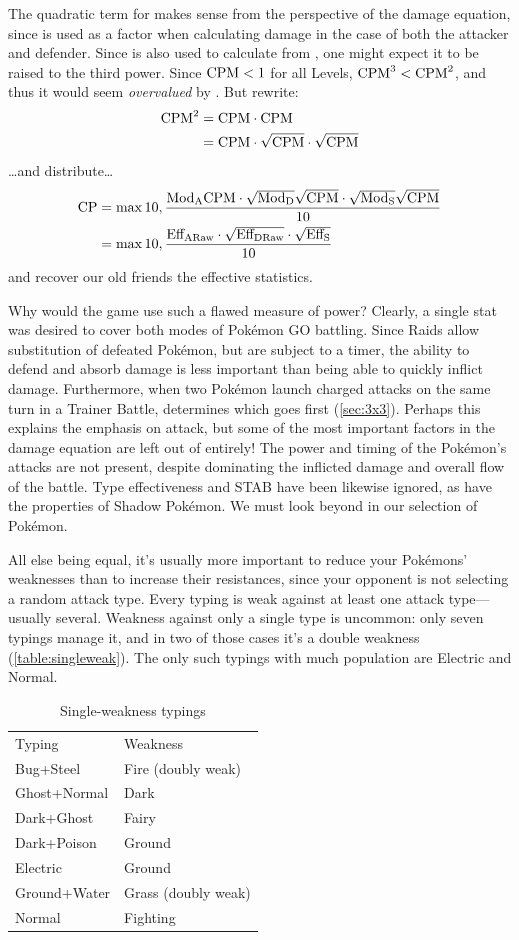 The quadratic term for \CPM{} makes sense from the perspective of the damage
 equation, since \CPM{} is used as a factor when calculating damage in the
 case of both the attacker and defender.
Since \CPM{} is also used to calculate \MHP{} from , one might
 expect it to be raised to the third power.
Since $\mbox{CPM} < 1$ for all Levels, $\mbox{CPM}^3 < \mbox{CPM}^2$, and thus it would seem \textit{overvalued} by \CP\@.
But rewrite:
\begin{align*}
  \mbox{CPM}^2 &= \mbox{CPM} \cdot \mbox{CPM}\\
  &= \mbox{CPM} \cdot \sqrt{\mbox{CPM}} \cdot \sqrt{\mbox{CPM}}
\end{align*}
…and distribute…
\begin{align*}
  \mbox{CP} &= \max{10, \frac{\mbox{$\text{Mod}_\text{A}$}\mbox{CPM}\cdot \sqrt{\mbox{$\text{Mod}_\text{D}$}}\sqrt{\mbox{CPM}} \cdot \sqrt{\mbox{$\text{Mod}_\text{S}$}}\sqrt{\mbox{CPM}}}{10}}\\
  &= \max{10, \frac{\mbox{$\text{Eff}_\text{ARaw}$} \cdot \sqrt{\mbox{$\text{Eff}_\text{DRaw}$}} \cdot \sqrt{\mbox{$\text{Eff}_\text{S}$}}}{10}}
\end{align*}
and recover our old friends the effective statistics.

Why would the game use such a flawed measure of power?
Clearly, a single stat was desired to cover both modes of Pokémon GO battling.
Since Raids allow substitution of defeated Pokémon, but are subject to a timer,
  the ability to defend and absorb damage is less important than being able to
  quickly inflict damage.
Furthermore, when two Pokémon launch charged attacks on the same turn in a Trainer
  Battle,  determines which goes first (\autoref{sec:3x3}).
Perhaps this explains the emphasis on attack, but some of the most important
  factors in the damage equation are left out of \CP{} entirely!
The power and timing of the Pokémon's attacks are not present, despite
  dominating the inflicted damage and overall flow of the battle.
Type effectiveness and STAB have been likewise ignored, as have the
  properties of Shadow Pokémon.
We must look beyond \CP{} in our selection of Pokémon.

All else being equal, it's usually more important to reduce your Pokémons'
  weaknesses than to increase their resistances, since your opponent is not selecting a random attack type.
Every typing is weak against at least one attack type---usually several.
Weakness against only a single type is uncommon: only seven typings manage it, and in two
 of those cases it's a double weakness (\autoref{table:singleweak}).
The only such typings with much population are Electric and Normal. 
\begin{table}[ht]
\centering
\begin{tabular}{ll}
Typing & Weakness\\
\Midrule
Bug+Steel & Fire (doubly weak) \\
Ghost+Normal & Dark \\
Dark+Ghost & Fairy \\
Dark+Poison & Ground \\
Electric & Ground \\
Ground+Water & Grass (doubly weak) \\
Normal & Fighting \\
\end{tabular}
  \caption{Single-weakness typings\label{table:singleweak}}
\end{table}

